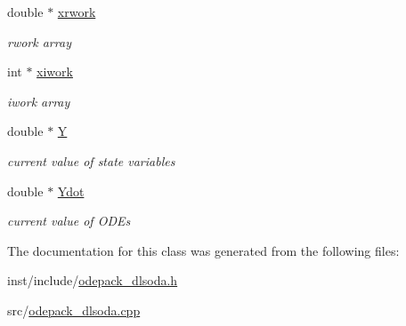 \begin{DoxyCompactItemize}
\mbox{\label{classodepack__dlsoda_a824cd623c15909783611cfc319ddbfb9}} 
double $\ast$ \hyperlink{classodepack__dlsoda_a824cd623c15909783611cfc319ddbfb9}{xrwork}
\begin{DoxyCompactList}\small\item\em rwork array \end{DoxyCompactList}\item 
\mbox{\label{classodepack__dlsoda_a111f730fd182cc30acea9327f5c224a1}} 
int $\ast$ \hyperlink{classodepack__dlsoda_a111f730fd182cc30acea9327f5c224a1}{xiwork}
\begin{DoxyCompactList}\small\item\em iwork array \end{DoxyCompactList}\item 
\mbox{\label{classodepack__dlsoda_a6dce361fe841a8a9f3d5d1400889627e}} 
double $\ast$ \hyperlink{classodepack__dlsoda_a6dce361fe841a8a9f3d5d1400889627e}{Y}
\begin{DoxyCompactList}\small\item\em current value of state variables \end{DoxyCompactList}\item 
\mbox{\label{classodepack__dlsoda_a3681231289f4223f080b460eb4cce7fc}} 
double $\ast$ \hyperlink{classodepack__dlsoda_a3681231289f4223f080b460eb4cce7fc}{Ydot}
\begin{DoxyCompactList}\small\item\em current value of O\+D\+Es \end{DoxyCompactList}\end{DoxyCompactItemize}


The documentation for this class was generated from the following files\+:\begin{DoxyCompactItemize}
\item 
inst/include/\hyperlink{odepack__dlsoda_8h}{odepack\+\_\+dlsoda.\+h}\item 
src/\hyperlink{odepack__dlsoda_8cpp}{odepack\+\_\+dlsoda.\+cpp}\end{DoxyCompactItemize}
